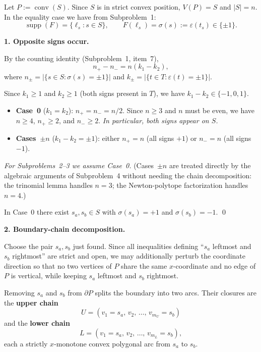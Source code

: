 
Let \(P:=\operatorname{conv}(S)\). Since \(S\) is in strict convex position,
\(V(P)=S\) and \(|S|=n\). In the equality case we have from Subproblem~1:
\[
\operatorname{supp}(F)=\{\ell_s:s\in S\},\qquad F(\ell_s)=\sigma(s):=\varepsilon(t_s)\in\{\pm1\}.
\]

\medskip
\textbf{1. Opposite signs occur.}

By the counting identity (Subproblem~1, item~7),
\[
n_+ - n_- = n(k_1-k_2),
\]
where \(n_\pm = |\{s\in S:\sigma(s)=\pm1\}|\) and \(k_\pm = |\{t\in T:\varepsilon(t)=\pm1\}|\).

Since \(k_1\ge1\) and \(k_2\ge1\) (both signs present in \(T\)), we have \(k_1-k_2\in\{-1,0,1\}\).

\begin{itemize}
\item \textbf{Case~0} (\(k_1=k_2\)): \(n_+=n_-=n/2\).  Since \(n\ge3\) and \(n\) must be even,
  we have \(n\ge4\), \(n_+\ge2\), and \(n_-\ge2\).  \emph{In particular, both signs appear on \(S\).}
\item \textbf{Cases~\(\pm n\)} (\(k_1-k_2=\pm1\)): either \(n_+=n\) (all signs \(+1\)) or
  \(n_-=n\) (all signs \(-1\)).
\end{itemize}

\emph{For Subproblems~2--3 we assume Case~0.}  (Cases~\(\pm n\) are treated directly by
the algebraic arguments of Subproblem~4 without needing the chain decomposition:
the trinomial lemma handles \(n=3\); the Newton-polytope factorization handles \(n=4\).)

In Case~0 there exist \(s_a,s_b\in S\) with \(\sigma(s_a)=+1\) and \(\sigma(s_b)=-1\). \qed

\medskip
\textbf{2. Boundary-chain decomposition.}

Choose the pair \(s_a,s_b\) just found.  Since all inequalities defining ``\(s_a\) leftmost
and \(s_b\) rightmost'' are strict and open, we may additionally perturb the coordinate
direction so that no two vertices of \(P\) share the same \(x\)-coordinate and no edge of
\(P\) is vertical, while keeping \(s_a\) leftmost and \(s_b\) rightmost.

Removing \(s_a\) and \(s_b\) from \(\partial P\) splits the boundary into two arcs.
Their closures are the \textbf{upper chain}
\[
U=(v_1=s_a,\,v_2,\,\dots,\,v_{m_U}=s_b)
\]
and the \textbf{lower chain}
\[
L=(v_1=s_a,\,v_2,\,\dots,\,v_{m_L}=s_b),
\]
each a strictly \(x\)-monotone convex polygonal arc from \(s_a\) to \(s_b\).

